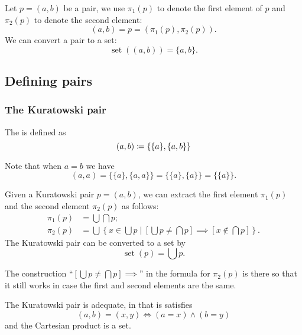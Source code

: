\begin{definition}
Let $p = (a,b)$ be a pair, we use $\pi_1(p)$ to denote the first element of $p$ and $\pi_2(p)$ to denote the second element:
\[ (a,b) = p = (\pi_1(p),\pi_2(p)). \]
We can convert a pair to a set:
\[ \operatorname{set}((a,b)) = \{a,b\}. \]
\end{definition}
\subsection{Defining pairs}
\subsubsection{The Kuratowski pair}
\begin{definition}
The  is defined as
\[ (a,b) \coloneqq \{\{a\}, \{a,b\}\} \]
\end{definition}
Note that when $a=b$ we have
\[ (a,a) = \{\{a\},\{a,a\}\} = \{\{a\},\{a\}\} = \{\{a\}\}. \]
\begin{lemma}
Given a Kuratowski pair $p = (a,b)$, we can extract the first element $\pi_1(p)$ and the second element $\pi_2(p)$ as follows:
\begin{align*}
\pi_1(p) &= \bigcup\bigcap p; \\
\pi_2(p) &= \bigcup\left\{ x\in\bigcup p\;|\; \left[\bigcup p \neq \bigcap p\right] \implies \left[ x\notin \bigcap p \right] \right\}.
\end{align*}
The Kuratowski pair can be converted to a set by
\[ \operatorname{set}(p) = \bigcup p. \]
\end{lemma}
The construction ``$\left[\bigcup p \neq \bigcap p\right] \implies$'' in the formula for $\pi_2(p)$ is there so that it still works in case the first and second elements are the same.
\begin{proposition}
The Kuratowski pair is adequate, in that is satisfies
\[ (a,b) = (x,y) \iff (a=x)\land (b=y) \]
and the Cartesian product is a set.
\end{proposition}
